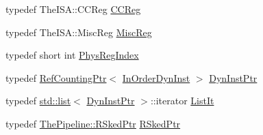 \begin{DoxyCompactItemize}
\item 
typedef TheISA::CCReg \hyperlink{classInOrderDynInst_a0c9de550a32808e6a25b54b6c791d5ab}{CCReg}
\item 
typedef TheISA::MiscReg \hyperlink{classInOrderDynInst_aaf5f073a387db0556d1db4bcc45428bc}{MiscReg}
\item 
typedef short int \hyperlink{classInOrderDynInst_a5ec29599c4bc29a3054c451674969e7b}{PhysRegIndex}
\item 
typedef \hyperlink{classRefCountingPtr}{RefCountingPtr}$<$ \hyperlink{classInOrderDynInst}{InOrderDynInst} $>$ \hyperlink{classInOrderDynInst_a6c43cc7218ba606c2e7843dc48b21b6e}{DynInstPtr}
\item 
typedef \hyperlink{classstd_1_1list}{std::list}$<$ \hyperlink{classRefCountingPtr}{DynInstPtr} $>$::iterator \hyperlink{classInOrderDynInst_a184cb829e22cc656acb41864f68f51ea}{ListIt}
\item 
typedef \hyperlink{classResourceSked}{ThePipeline::RSkedPtr} \hyperlink{classInOrderDynInst_aa8438d785c412d76334bc7d3f7a486c0}{RSkedPtr}
\end{DoxyCompactItemize}
